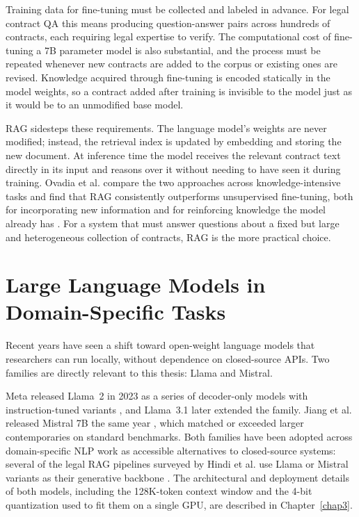 Training data for fine-tuning must be collected and labeled in advance. For legal contract QA this means producing question-answer pairs across hundreds of contracts, each requiring legal expertise 
to verify. The computational cost of fine-tuning a 7B parameter model is also substantial, and the process must be repeated whenever new contracts are added to the corpus or existing ones are revised. Knowledge acquired through fine-tuning is encoded statically in the model weights, so a contract added after training is invisible to the model just as it would be to an unmodified base model.

RAG sidesteps these requirements. The language model's weights are never modified; instead, the retrieval index is updated by embedding and storing the new document. At inference time the model receives the relevant contract text directly in its input and reasons over it without needing to have seen it during training. Ovadia et al. compare the two approaches across knowledge-intensive tasks and find that RAG consistently outperforms unsupervised fine-tuning, both for incorporating new information and for reinforcing knowledge the model already has \cite{ovadia2023finetuning}. For a system that must answer questions about a fixed but large and heterogeneous collection of contracts, RAG is the more practical choice.

\section{Large Language Models in Domain-Specific Tasks}
Recent years have seen a shift toward open-weight language models that 
researchers can run locally, without dependence on closed-source APIs. 
Two families are directly relevant to this thesis: Llama and Mistral.

Meta released Llama~2 in 2023 as a series of decoder-only models with  instruction-tuned variants \cite{touvron2023llama2}, and Llama~3.1 \cite{meta2024llama3} later extended the family. Jiang et al. released Mistral 7B the same year \cite{jiang2023mistral}, which matched or exceeded 
larger contemporaries on standard benchmarks. Both families have been adopted across domain-specific NLP work as accessible alternatives to closed-source systems: several of the legal RAG pipelines surveyed by Hindi et al. use Llama or Mistral variants as their generative backbone \cite{hindi2024ragsurvey}. The architectural and deployment details of both models, including the 128K-token context window and the 4-bit quantization used to fit them on a single GPU, are described in Chapter~\ref{chap3}.


